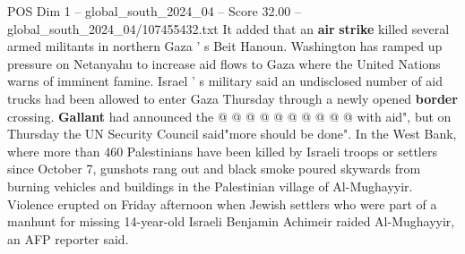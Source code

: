 \begin{textsample}{POS Dim 1 – global\_south\_2024\_04 – Score 32.00 – global\_south\_2024\_04/107455432.txt}
It added that an \textbf{air} \textbf{strike} killed several armed militants in northern Gaza ' s Beit Hanoun.
Washington has ramped up pressure on Netanyahu to increase aid flows to Gaza where the United Nations warns of imminent famine.
Israel ' s military said an undisclosed number of aid trucks had been allowed to enter Gaza Thursday through a newly opened \textbf{border} crossing. \textbf{Gallant} had announced the @ @ @ @ @ @ @ @ @ @ with aid", but on Thursday the UN Security Council said"more should be done".
In the West Bank, where more than 460 Palestinians have been killed by Israeli troops or settlers since October 7, gunshots rang out and black smoke poured skywards from burning vehicles and buildings in the Palestinian village of Al-Mughayyir.
Violence erupted on Friday afternoon when Jewish settlers who were part of a manhunt for missing 14-year-old Israeli Benjamin Achimeir raided Al-Mughayyir, an AFP reporter said.

\end{textsample}
